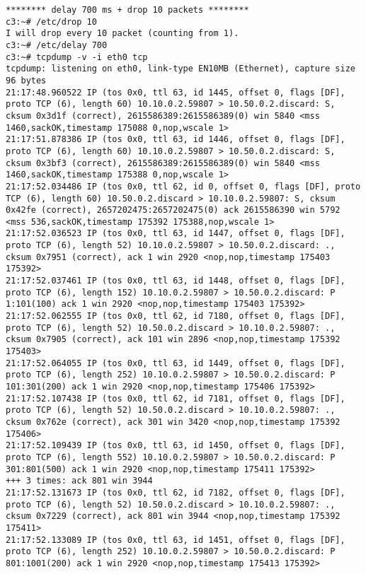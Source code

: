 \documentclass[a4paper,12pt]{article}
\begin{document}
\begin{lstlisting}
******** delay 700 ms + drop 10 packets ********
c3:~# /etc/drop 10
I will drop every 10 packet (counting from 1).
c3:~# /etc/delay 700
c3:~# tcpdump -v -i eth0 tcp
tcpdump: listening on eth0, link-type EN10MB (Ethernet), capture size 96 bytes
21:17:48.960522 IP (tos 0x0, ttl 63, id 1445, offset 0, flags [DF], proto TCP (6), length 60) 10.10.0.2.59807 > 10.50.0.2.discard: S, cksum 0x3d1f (correct), 2615586389:2615586389(0) win 5840 <mss 1460,sackOK,timestamp 175088 0,nop,wscale 1>
21:17:51.878386 IP (tos 0x0, ttl 63, id 1446, offset 0, flags [DF], proto TCP (6), length 60) 10.10.0.2.59807 > 10.50.0.2.discard: S, cksum 0x3bf3 (correct), 2615586389:2615586389(0) win 5840 <mss 1460,sackOK,timestamp 175388 0,nop,wscale 1>
21:17:52.034486 IP (tos 0x0, ttl 62, id 0, offset 0, flags [DF], proto TCP (6), length 60) 10.50.0.2.discard > 10.10.0.2.59807: S, cksum 0x42fe (correct), 2657202475:2657202475(0) ack 2615586390 win 5792 <mss 536,sackOK,timestamp 175392 175388,nop,wscale 1>
21:17:52.036523 IP (tos 0x0, ttl 63, id 1447, offset 0, flags [DF], proto TCP (6), length 52) 10.10.0.2.59807 > 10.50.0.2.discard: ., cksum 0x7951 (correct), ack 1 win 2920 <nop,nop,timestamp 175403 175392>
21:17:52.037461 IP (tos 0x0, ttl 63, id 1448, offset 0, flags [DF], proto TCP (6), length 152) 10.10.0.2.59807 > 10.50.0.2.discard: P 1:101(100) ack 1 win 2920 <nop,nop,timestamp 175403 175392>
21:17:52.062555 IP (tos 0x0, ttl 62, id 7180, offset 0, flags [DF], proto TCP (6), length 52) 10.50.0.2.discard > 10.10.0.2.59807: ., cksum 0x7905 (correct), ack 101 win 2896 <nop,nop,timestamp 175392 175403>
21:17:52.064055 IP (tos 0x0, ttl 63, id 1449, offset 0, flags [DF], proto TCP (6), length 252) 10.10.0.2.59807 > 10.50.0.2.discard: P 101:301(200) ack 1 win 2920 <nop,nop,timestamp 175406 175392>
21:17:52.107438 IP (tos 0x0, ttl 62, id 7181, offset 0, flags [DF], proto TCP (6), length 52) 10.50.0.2.discard > 10.10.0.2.59807: ., cksum 0x762e (correct), ack 301 win 3420 <nop,nop,timestamp 175392 175406>
21:17:52.109439 IP (tos 0x0, ttl 63, id 1450, offset 0, flags [DF], proto TCP (6), length 552) 10.10.0.2.59807 > 10.50.0.2.discard: P 301:801(500) ack 1 win 2920 <nop,nop,timestamp 175411 175392>
+++ 3 times: ack 801 win 3944
21:17:52.131673 IP (tos 0x0, ttl 62, id 7182, offset 0, flags [DF], proto TCP (6), length 52) 10.50.0.2.discard > 10.10.0.2.59807: ., cksum 0x7229 (correct), ack 801 win 3944 <nop,nop,timestamp 175392 175411>
21:17:52.133089 IP (tos 0x0, ttl 63, id 1451, offset 0, flags [DF], proto TCP (6), length 252) 10.10.0.2.59807 > 10.50.0.2.discard: P 801:1001(200) ack 1 win 2920 <nop,nop,timestamp 175413 175392>

\end{lstlisting}
\end{document}
